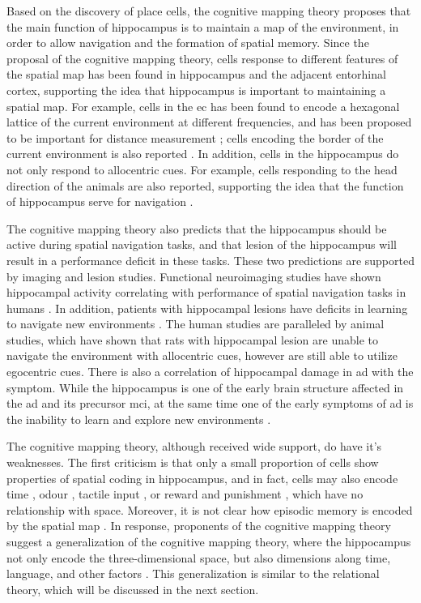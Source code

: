 Based on the discovery of place cells, the cognitive mapping theory proposes that the main function of hippocampus is to maintain a map of the environment, in order to allow navigation and the formation of spatial memory. Since the proposal of the cognitive mapping theory, cells response to different features of the spatial map has been found in hippocampus and the adjacent entorhinal cortex, supporting the idea that hippocampus is important to maintaining a spatial map. For example, cells in the \gls{ec} has been found to encode a hexagonal lattice of the current environment at different frequencies, and has been proposed to be important for distance measurement \citep{fyhn04, hafting05, moser15}; cells encoding the border of the current environment is also reported \citep{solstad08}. In addition, cells in the hippocampus do not only respond to allocentric cues. For example, cells responding to the head direction of the animals are also reported, supporting the idea that the function of hippocampus serve for navigation \citep{sargolini06}. 

The cognitive mapping theory also predicts that the hippocampus should be active during spatial navigation tasks, and that lesion of the hippocampus will result in a performance deficit in these tasks. These two predictions are supported by imaging and lesion studies. Functional neuroimaging studies have shown hippocampal activity correlating with performance of spatial navigation tasks in humans \citep{burgess02, hartley07}. In addition, patients with hippocampal lesions have deficits in learning to navigate new environments \citep{hartley07}. The human studies are paralleled by animal studies, which have shown that rats with hippocampal lesion are unable to navigate the environment with allocentric cues, however are still able to utilize egocentric cues\citep{morris06}. There is also a correlation of hippocampal damage in \gls{ad} with the symptom. While the hippocampus is one of the early brain structure affected in the \gls{ad} and its precursor \gls{mci}, at the same time one of the early symptoms of \gls{ad} is the inability to learn and explore new environments \citep{vlcek14}.

The cognitive mapping theory, although received wide support, do have it's weaknesses. The first criticism is that only a small proportion of cells show properties of spatial coding in hippocampus, and in fact, cells may also encode time \citep{hampson93}, odour \citep{wood99}, tactile input \citep{young94}, or reward and punishment \citep{moser08}, which have no relationship with space. Moreover, it is not clear how episodic memory is encoded by the spatial map \citep{konkel09}. In response, proponents of the cognitive mapping theory suggest a generalization of the cognitive mapping theory, where the hippocampus not only encode the three-dimensional space, but also dimensions along time, language, and other factors \citep{burgess02}. This generalization is similar to the relational theory, which will be discussed in the next section.

